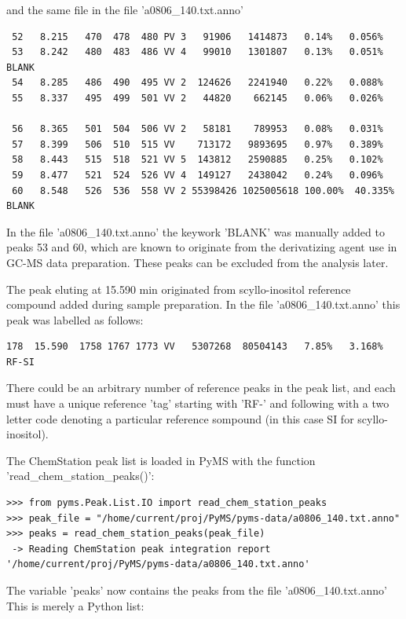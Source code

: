 \noindent
and the same file in the file 'a0806\_140.txt.anno'

\begin{verbatim}
 52   8.215   470  478  480 PV 3   91906   1414873   0.14%   0.056%
 53   8.242   480  483  486 VV 4   99010   1301807   0.13%   0.051% BLANK
 54   8.285   486  490  495 VV 2  124626   2241940   0.22%   0.088%
 55   8.337   495  499  501 VV 2   44820    662145   0.06%   0.026%
 
 56   8.365   501  504  506 VV 2   58181    789953   0.08%   0.031%
 57   8.399   506  510  515 VV    713172   9893695   0.97%   0.389%
 58   8.443   515  518  521 VV 5  143812   2590885   0.25%   0.102%
 59   8.477   521  524  526 VV 4  149127   2438042   0.24%   0.096%
 60   8.548   526  536  558 VV 2 55398426 1025005618 100.00%  40.335% BLANK
\end{verbatim}

\noindent
In the file 'a0806\_140.txt.anno' the keywork 'BLANK' was manually
added to peaks 53 and 60, which are known to originate from the
derivatizing agent use in GC-MS data preparation.  These peaks can 
be excluded from the analysis later.

The peak eluting at 15.590 min originated from scyllo-inositol reference
compound added during sample preparation. In the file 'a0806\_140.txt.anno'
this peak was labelled as follows:

\begin{verbatim}
178  15.590  1758 1767 1773 VV   5307268  80504143   7.85%   3.168% RF-SI
\end{verbatim}

\noindent
There could be an arbitrary number of reference peaks in the peak list,
and each must have a unique reference 'tag' starting with 'RF-' and
following with a two letter code denoting a particular reference sompound
(in this case SI for scyllo-inositol).

The ChemStation peak list is loaded in PyMS with the function
'read\_chem\_station\_peaks()':

\begin{verbatim}
>>> from pyms.Peak.List.IO import read_chem_station_peaks
>>> peak_file = "/home/current/proj/PyMS/pyms-data/a0806_140.txt.anno"
>>> peaks = read_chem_station_peaks(peak_file)
 -> Reading ChemStation peak integration report
'/home/current/proj/PyMS/pyms-data/a0806_140.txt.anno'
\end{verbatim}

\noindent
The variable 'peaks' now contains the peaks from the file 'a0806\_140.txt.anno'
This is merely a Python list:

